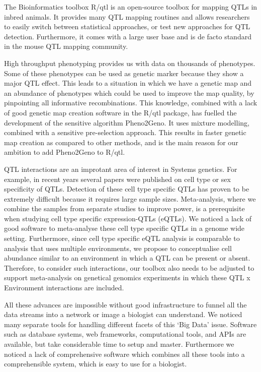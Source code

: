 The Bioinformatics toolbox R/qtl \cite{Broman:2003, Arends:2010} is an open-source toolbox for mapping QTLs in inbred 
animals. It provides many QTL mapping routines and allows researchers to easily switch between statistical approaches, 
or test new approaches for QTL detection. Furthermore, it comes with a large user base and is de facto standard in 
the mouse QTL mapping community.

High throughput phenotyping provides us with data on thousands of phenotypes. Some of these phenotypes can be used 
as genetic marker because they show a major QTL effect. This leads to a situation in which we have a genetic 
map and an abundance of phenotypes which could be used to improve the map quality, by pinpointing all informative recombinations. 
This knowledge, combined with a lack of good genetic map creation software in the R/qtl package, has fuelled the development of the sensitive algorithm 
Pheno2Geno. It uses mixture modelling, combined with a sensitive pre-selection approach. This results in faster 
genetic map creation as compared to other methods, and is the main reason for our ambition to add Pheno2Geno to R/qtl. 

QTL interactions are an improtant area of interest in Systems genetics. For example, in recent years several papers were 
published on cell type or sex specificity of QTLs. Detection of these cell type specific QTLs has proven to be extremely 
difficult because it requires large sample sizes.  Meta-analysis, where we combine the samples from separate studies 
to improve power, is a prerequisite when studying cell type specific expression-QTLs (eQTLs). We noticed a lack of 
good software to meta-analyse these cell type specific QTLs in a genome wide setting. Furthermore, since cell type specific 
eQTL analysis is comparable to analysis that uses multiple environments, we propose to conceptualise cell abundance 
similar to an environment in which a QTL can be present or absent. Therefore, to consider such interactions, our toolbox 
also needs to be adjusted to support meta-analysis on genetical genomics experiments in which these QTL x Environment 
interactions are included.

All these advances are impossible without good infrastructure to funnel all the data streams into a network or image a 
biologist can understand. We noticed many separate tools for handling different facets of this ‘Big Data’ issue. Software 
such as database systems, web frameworks, computational tools, and APIs are available, but take considerable time to 
setup and master. Furthermore we noticed a lack of comprehensive software which combines all these tools into a 
comprehensible system, which is easy to use for a biologist.

